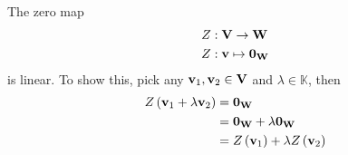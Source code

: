 \begin{example}\label{eg:zero-map-is-linear}
    The zero map 
    \begin{align*}
        Z&: \mathbf{V} \to \mathbf{W}\\
        Z&: \vb{v} \mapsto \vb{0}_{\mathbf{W}}
    \end{align*}
    is linear. To show this, pick any \( \vb{v}_{1}, \vb{v}_{2} \in \mathbf{V} \) and \(  \lambda \in \mathbb{K} \), then 
    \begin{align*}
        Z \left( \vb{v}_{1} + \lambda \vb{v}_{2} \right) &= \vb{0}_{\mathbf{W}}\\
        &= \vb{0}_{\mathbf{W}} + \lambda \vb{0}_{\mathbf{W}} \\
        &= Z \left( \vb{v}_{1} \right) + \lambda Z \left( \vb{v}_{2} \right)
    \end{align*}
\end{example}



